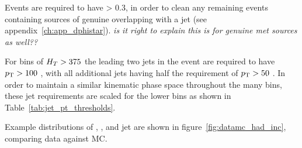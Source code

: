 Events are required to have \dphistar > 0.3, in order to clean any remaining 
events containing sources of genuine \met overlapping with a jet (see
appendix~\ref{ch:app_dphistar}).
\emph{is it right to explain this is for genuine met sources as well??}

For bins of $H_T>375$ \gev the leading two jets in the event are required to 
have ${p_{\text T}}>100$ \gev, with all additional jets having half the requirement of
${p_{\text T}}>50$ \gev. In order to maintain a similar kinematic phase space throughout
the many \HT bins, these jet \Pt requirements are scaled for the lower \HT bins 
as shown in Table~\ref{tab:jet_pt_thresholds}.


Example distributions of \alphat, \HT, \mht and jet \Pt  are shown in
figure~\ref{fig:datamc_had_inc}, comparing data against MC.

